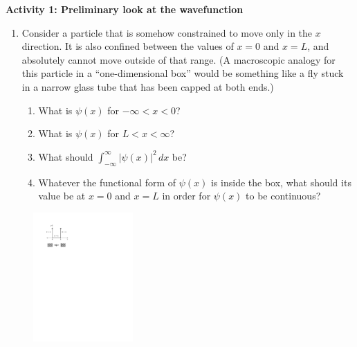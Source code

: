\textbf{Activity 1: Preliminary look at the wavefunction}
\begin{enumerate}[wide]
\item Consider a particle that is somehow constrained to move only in the $x$ direction.  It is also confined between the values of $x=0$ and $x=L$, and absolutely cannot move outside of that range.
(A macroscopic analogy for this particle in a ``one-dimensional box'' would be something like a fly stuck in a narrow glass tube that has been capped at both ends.)
\begin{enumerate}[labparts]
\item What is $\psi(x)$ for $-\infty < x < 0$?
\answerspace{0.3in}

\item What is $\psi(x)$ for $L < x < \infty$?
\answerspace{0.3in}

\item What should $\displaystyle \int_{-\infty}^\infty \left|\psi(x)\right|^2  \, dx$ be?
\answerspace{0.3in}

\item Whatever the functional form of $\psi(x)$ is inside the box, what should its value be at $x=0$ and $x=L$ in order for 
$\psi(x)$ to be continuous?
\answerspace{0.3in}
\end{enumerate}
\end{enumerate}
\pagebreak

\begin{figure}
\begin{center}
\vspace{-0.2in}
\includegraphics[width=0.34\textwidth]{particle_in_infinite_well/infinite_potential.pdf}
\end{center}
\end{figure}


